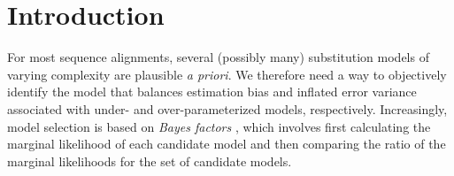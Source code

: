 \section{Introduction}

For most sequence alignments, several (possibly many) substitution models of varying complexity are plausible {\it a priori}.
We therefore need a way to objectively identify the model that balances estimation bias and inflated error variance associated with under- and over-parameterized models, respectively.
Increasingly, model selection is based on \textit{Bayes factors} \citep[{\it e.g.},][]{Suchard2001,Lartillot2006,Xie2011,Baele2012,Baele2013}, which involves first calculating the marginal likelihood of each candidate model and then comparing the ratio of the marginal likelihoods for the set of candidate models.


